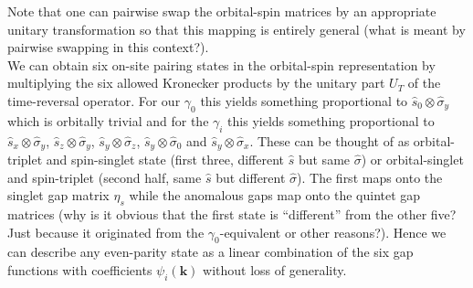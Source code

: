 \documentclass[english, parskip=full]{scrartcl}
\begin{document}
Note that one can pairwise swap the orbital-spin matrices by an appropriate unitary transformation so that this mapping is entirely general (\color{red}what is meant by pairwise swapping in this context?\color{black}).\\
We can obtain six \color{red} on-site pairing states \color{black} in the orbital-spin representation by multiplying the six allowed Kronecker products by the unitary part $U_T$ of the time-reversal operator.
For our $\gamma_0$ this yields something proportional to $\hat{s}_0 \otimes \hat{\sigma}_y$ which is orbitally trivial and for the $\gamma_i$ this yields something proportional to $\hat{s}_x \otimes \hat{\sigma}_y$, $\hat{s}_z \otimes \hat{\sigma}_y$, $\hat{s}_y \otimes \hat{\sigma}_z$, $\hat{s}_y \otimes \hat{\sigma}_0$ and $\hat{s}_y \otimes \hat{\sigma}_x$.
These can be thought of as orbital-triplet and spin-singlet state (first three, different $\hat{s}$ but same $\hat{\sigma}$) or orbital-singlet and spin-triplet (second half, same $\hat{s}$ but different $\hat{\sigma}$).
The first maps onto the singlet gap matrix $\eta_s$ while the anomalous gaps map onto the quintet gap matrices (\color{red}why is it obvious that the first state is ``different'' from the other five? Just because it originated from the $\gamma_0$-equivalent or other reasons?\color{black}).
Hence we can describe any even-parity state as a linear combination of the six gap functions with coefficients $\psi_i(\textbf{k})$ without loss of generality.
\end{document}
